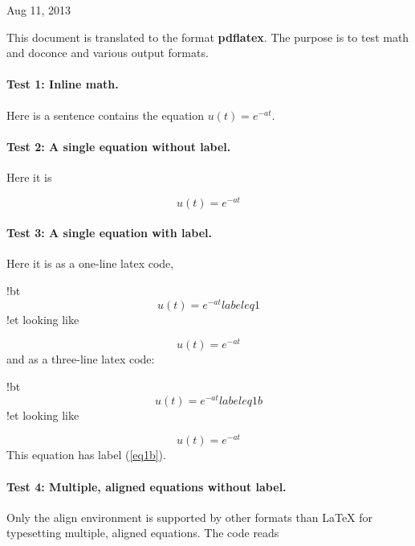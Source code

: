 \documentclass[%
oneside,                 %
final,                   %
10pt]{article}
\begin{document}
\begin{center}
Aug 11, 2013
\end{center}

\vspace{1cm}



This document is translated to the format \textbf{pdflatex}. The purpose is to
test math and doconce and various output formats.

\paragraph{Test 1: Inline math.}
Here is a sentence contains the equation $u(t)=e^{-at}$.

\paragraph{Test 2: A single equation without label.}
Here it is

\[ u(t)=e^{-at} \]

\paragraph{Test 3: A single equation with label.}
Here it is as a one-line
latex code,

\bccq
!bt
\begin{equation} u(t)=e^{-at} label{eq1}\end{equation}
!et
\eccq
looking like

\begin{equation} u(t)=e^{-at} \label{eq1}\end{equation}
and as a three-line latex code:

\bccq
!bt
\begin{equation}
u(t)=e^{-at} label{eq1b}
\end{equation}
!et
\eccq
looking like

\begin{equation}
u(t)=e^{-at} \label{eq1b}
\end{equation}
This equation has label (\ref{eq1b}).


\paragraph{Test 4: Multiple, aligned equations without label.}
Only the align
environment is supported by other formats than {\LaTeX} for typesetting
multiple, aligned equations. The code reads
\end{document}
